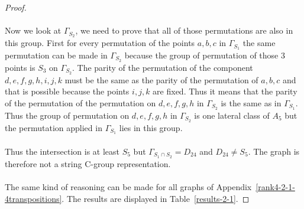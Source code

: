 \begin{proof}
  \paragraph{}
  Now we look at $\Gamma_{S_2}$, we need to prove that all of those permutations are also in this group. First for every permutation of the points $a,b,c$ in $\Gamma_{S_1}$ the same permutation can be made in $\Gamma_{S_2}$ because the group of permutation of those 3 points is $S_3$ on $\Gamma_{S_2}$. The parity of the permutation of the component $d,e,f,g,h,i,j,k$ must be the same as the parity of the permutation of $a,b,c$ and that is possible because the points $i,j,k$ are fixed. Thus it means that the parity of the permutation of the permutation on $d,e,f,g,h$ in $\Gamma_{S_2}$ is the same as in $\Gamma_{S_1}$. Thus the group of permutation on $d,e,f,g,h$ in $\Gamma_{S_2}$ is one lateral class of $A_5$ but the permutation applied in $\Gamma_{S_1}$ lies in this group.

  \paragraph{}
  Thus the intersection is at least $S_5$ but $\Gamma_{S_1 \cap S_2} = D_{24}$ and $D_{24} \neq S_5$. The graph is therefore not a string C-group representation.

  \paragraph{}
  The same kind of reasoning can be made for all graphs of Appendix~\ref{rank4-2-1-4transpositions}. The results are displayed in Table~\ref{results-2-1}.


\end{proof}
